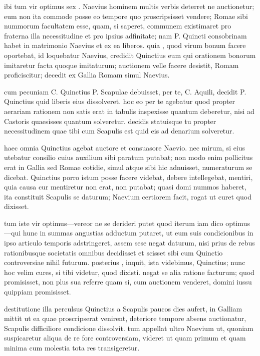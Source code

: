  ibi tum vir optimus sex . Naevius hominem multis verbis deterret ne auctionetur; eum non ita commode posse eo tempore quo proscripsisset vendere; Romae sibi nummorum facultatem esse, quam, si saperet, communem existimaret pro fraterna illa necessitudine et pro ipsius adfinitate; nam P. Quincti consobrinam habet in matrimonio Naevius et ex ea liberos. quia , quod virum bonum facere oportebat, id loquebatur Naevius, credidit Quinctius eum qui orationem bonorum imitaretur facta quoque imitaturum; auctionem velle facere desistit, Romam proficiscitur; decedit ex Gallia Romam simul Naevius.

 cum pecuniam C. Quinctius P. Scapulae debuisset, per te, C. Aquili, decidit P. Quinctius quid liberis eius dissolveret. hoc eo per te agebatur quod propter aerariam rationem non satis erat in tabulis inspexisse quantum deberetur, nisi ad Castoris quaesisses quantum solveretur. decidis statuisque tu propter necessitudinem quae tibi cum Scapulis est quid eis ad denarium solveretur.

 haec omnia Quinctius agebat auctore et consuasore Naevio. nec mirum, si eius utebatur consilio cuius auxilium sibi paratum putabat; non modo enim pollicitus erat in Gallia sed Romae cotidie, simul atque sibi hic adnuisset, numeraturum se dicebat. Quinctius porro istum posse facere videbat, debere intellegebat, mentiri, quia causa cur mentiretur non erat, non putabat; quasi domi nummos haberet, ita constituit Scapulis se daturum; Naevium certiorem facit, rogat ut curet quod dixisset.

 tum iste vir optimus—vereor ne se derideri putet quod iterum iam dico optimus —qui hunc in summas angustias adductum putaret, ut eum suis condicionibus in ipso articulo temporis adstringeret, assem sese negat daturum, nisi prius de rebus rationibusque societatis omnibus decidisset et scisset sibi cum Quinctio controversiae nihil futurum. posterius , inquit, ista videbimus, Quinctius; nunc hoc velim cures, si tibi videtur, quod dixisti. negat se alia ratione facturum; quod promisisset, non plus sua referre quam si, cum auctionem venderet, domini iussu quippiam promisisset.

 destitutione illa perculsus Quinctius a Scapulis paucos dies aufert, in Galliam mittit ut ea quae proscripserat venirent, deteriore tempore absens auctionatur, Scapulis difficiliore condicione dissolvit. tum appellat ultro Naevium ut, quoniam suspicaretur aliqua de re fore controversiam, videret ut quam primum et quam minima cum molestia tota res transigeretur.

